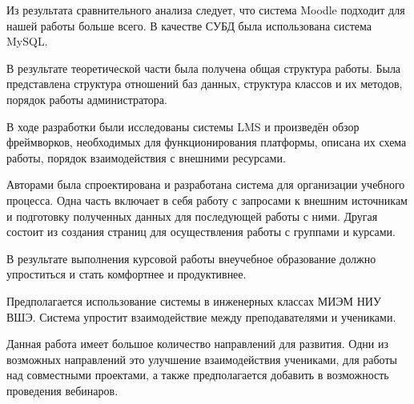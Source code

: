 \documentclass[a4paper,14pt]{article}
\begin{document}
Из результата сравнительного анализа следует, что система Moodle подходит для нашей работы больше всего. В качестве СУБД была использована система MySQL.

В результате теоретической части была получена общая структура работы. Была представлена структура отношений баз данных, структура классов и их методов, порядок работы администратора.


В ходе разработки были исследованы системы 
LMS и произведён обзор фреймворков, необходимых для функционирования платформы, описана их схема работы, порядок взаимодействия с внешними ресурсами.



Авторами была спроектирована и разработана система для организации учебного процесса.
Одна часть включает в себя работу с запросами к внешним источникам и подготовку полученных данных для последующей работы с ними.
Другая состоит из создания страниц для осуществления работы с группами и курсами.


В результате выполнения курсовой работы внеучебное образование должно упроститься и стать комфортнее и продуктивнее.


Предполагается использование системы в инженерных классах  МИЭМ НИУ ВШЭ.
Система упростит взаимодействие между преподавателями и учениками.


Данная работа имеет большое количество направлений для развития.
Одни из возможных направлений это улучшение взаимодействия учениками, для работы над совместными проектами, а также предполагается добавить в возможность проведения вебинаров.  

\end{document}
